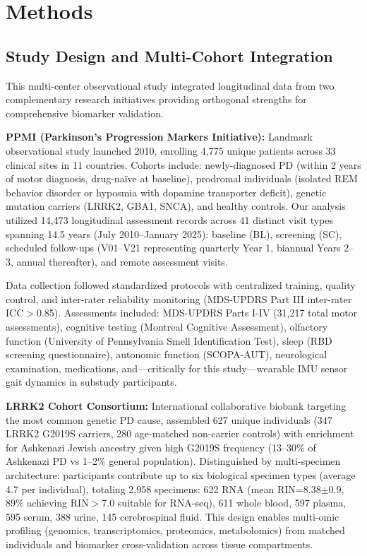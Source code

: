 \documentclass[11pt]{article}
\begin{document}
\section{Methods}

\subsection{Study Design and Multi-Cohort Integration}

This multi-center observational study integrated longitudinal data from two complementary research initiatives providing orthogonal strengths for comprehensive biomarker validation.

\textbf{PPMI (Parkinson's Progression Markers Initiative):}\cite{marek2018parkinson} Landmark observational study launched 2010, enrolling 4,775 unique patients across 33 clinical sites in 11 countries. Cohorts include: newly-diagnosed PD (within 2 years of motor diagnosis, drug-naïve at baseline), prodromal individuals (isolated REM behavior disorder or hyposmia with dopamine transporter deficit), genetic mutation carriers (LRRK2, GBA1, SNCA), and healthy controls. Our analysis utilized 14,473 longitudinal assessment records across 41 distinct visit types spanning 14.5 years (July 2010--January 2025): baseline (BL), screening (SC), scheduled follow-ups (V01--V21 representing quarterly Year 1, biannual Years 2--3, annual thereafter), and remote assessment visits.

Data collection followed standardized protocols with centralized training, quality control, and inter-rater reliability monitoring (MDS-UPDRS Part III inter-rater ICC$>$0.85). Assessments included: MDS-UPDRS Parts I-IV (31,217 total motor assessments)\cite{goetz2008movement}, cognitive testing (Montreal Cognitive Assessment), olfactory function (University of Pennsylvania Smell Identification Test)\cite{doty1984smell}, sleep (RBD screening questionnaire), autonomic function (SCOPA-AUT), neurological examination, medications, and—critically for this study—wearable IMU sensor gait dynamics in substudy participants.

\textbf{LRRK2 Cohort Consortium:}\cite{marder2015age,west2023lrrk2} International collaborative biobank targeting the most common genetic PD cause, assembled 627 unique individuals (347 LRRK2 G2019S carriers, 280 age-matched non-carrier controls) with enrichment for Ashkenazi Jewish ancestry given high G2019S frequency (13--30\% of Ashkenazi PD vs 1--2\% general population). Distinguished by multi-specimen architecture: participants contribute up to six biological specimen types (average 4.7 per individual), totaling 2,958 specimens: 622 RNA (mean RIN=8.38$\pm$0.9, 89\% achieving RIN$>$7.0 suitable for RNA-seq), 611 whole blood, 597 plasma, 595 serum, 388 urine, 145 cerebrospinal fluid. This design enables multi-omic profiling (genomics, transcriptomics, proteomics, metabolomics) from matched individuals and biomarker cross-validation across tissue compartments.
\end{document}
